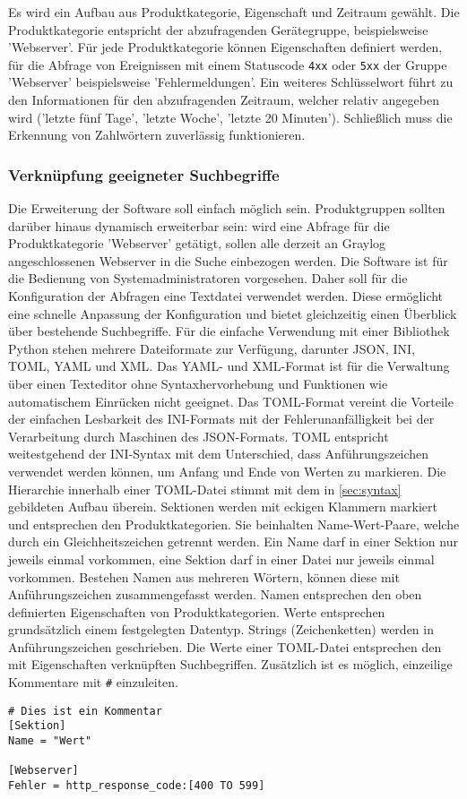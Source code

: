 Es wird ein Aufbau aus Produktkategorie, Eigenschaft und Zeitraum gewählt. Die Produktkategorie entspricht der abzufragenden Gerätegruppe, beispielsweise 'Webserver'. Für jede Produktkategorie können Eigenschaften definiert werden, für die Abfrage von Ereignissen mit einem Statuscode \lstinline{4xx} oder \lstinline{5xx} der Gruppe 'Webserver' beispielsweise 'Fehlermeldungen'. Ein weiteres Schlüsselwort führt zu den Informationen für den abzufragenden Zeitraum, welcher relativ angegeben wird ('letzte fünf Tage', 'letzte Woche', 'letzte 20 Minuten'). Schließlich muss die Erkennung von Zahlwörtern zuverlässig funktionieren.

\subsubsection{Verknüpfung geeigneter Suchbegriffe}

Die Erweiterung der Software soll einfach möglich sein. Produktgruppen sollten darüber hinaus dynamisch erweiterbar sein: wird eine Abfrage für die Produktkategorie 'Webserver' getätigt, sollen alle derzeit an Graylog angeschlossenen Webserver in die Suche einbezogen werden. Die Software ist für die Bedienung von Systemadministratoren vorgesehen. Daher soll für die Konfiguration der Abfragen eine Textdatei verwendet werden. Diese ermöglicht eine schnelle Anpassung der Konfiguration und bietet gleichzeitig einen Überblick über bestehende Suchbegriffe. Für die einfache Verwendung mit einer Bibliothek Python stehen mehrere Dateiformate zur Verfügung, darunter JSON, INI, TOML, YAML und XML. Das YAML- und XML-Format ist für die Verwaltung über einen Texteditor ohne Syntaxhervorhebung und Funktionen wie automatischem Einrücken nicht geeignet. Das TOML-Format vereint die Vorteile der einfachen Lesbarkeit des INI-Formats mit der Fehlerunanfälligkeit bei der Verarbeitung durch Maschinen des JSON-Formats. TOML entspricht weitestgehend der INI-Syntax mit dem Unterschied, dass Anführungszeichen verwendet werden können, um Anfang und Ende von Werten zu markieren. Die Hierarchie innerhalb einer TOML-Datei stimmt mit dem in \autoref{sec:syntax} gebildeten Aufbau überein. Sektionen werden mit eckigen Klammern markiert und entsprechen den Produktkategorien. Sie beinhalten Name-Wert-Paare, welche durch ein Gleichheitszeichen getrennt werden. Ein Name darf in einer Sektion nur jeweils einmal vorkommen, eine Sektion darf in einer Datei nur jeweils einmal vorkommen. Bestehen Namen aus mehreren Wörtern, können diese mit Anführungszeichen zusammengefasst werden. Namen entsprechen den oben definierten Eigenschaften von Produktkategorien. Werte entsprechen grundsätzlich einem festgelegten Datentyp. Strings (Zeichenketten) werden in Anführungszeichen geschrieben. Die Werte einer TOML-Datei entsprechen den mit Eigenschaften verknüpften Suchbegriffen. Zusätzlich ist es möglich, einzeilige Kommentare mit \lstinline{#} einzuleiten.

\begin{lstlisting}[caption={Beispiel der TOML-Syntax.}, label=toml-syntax, xleftmargin=6mm]
# Dies ist ein Kommentar
[Sektion]
Name = "Wert"

[Webserver]
Fehler = http_response_code:[400 TO 599] 
\end{lstlisting}

